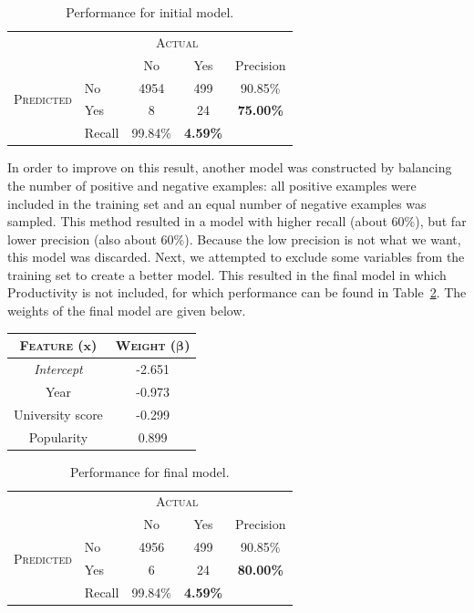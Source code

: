 \begin{table}
\centering
\begin{tabular}{c|l|c|c|c}
\multicolumn{2}{c|}{} & \multicolumn{2}{c|}{\textsc{Actual}}&\\ \cline{3-4}
\multicolumn{2}{c|}{\rule{0pt}{4mm}} &No&Yes&Precision\\ \hline
\multirow{2}{*}{\textsc{Predicted}}&\rule{0pt}{4mm}No&4954&499&90.85\%\\ \cline{2-5}
\rule{0pt}{4mm}&Yes&8&24&\textbf{75.00\%}\\ \hline
&\rule{0pt}{4mm}Recall&99.84\%&\textbf{4.59\%}&\\
\end{tabular}
\caption{Performance for initial model.}
\label{tbl:initialPerformance}
\end{table}

In order to improve on this result, another model was constructed by balancing the number of positive and negative examples: all positive examples were included in the training set and an equal number of negative examples was sampled. This method resulted in a model with higher recall (about 60\%), but far lower precision (also about 60\%). Because the low precision is not what we want, this model was discarded. Next, we attempted to exclude some variables from the training set to create a better model. This resulted in the final model in which Productivity is not included, for which performance can be found in Table~\ref{tbl:resultingPerformance}. The weights of the final model are given below.
\begin{table}[H]
\centering
\begin{tabular}{c|c}
\textsc{\textbf{Feature}} ($\mathbf{x}$) & \textsc{\textbf{Weight}} ($\boldsymbol{\beta}$)\\ \hline
\rule{0pt}{4mm}\emph{Intercept}&-2.651\\
Year&-0.973\\
University score&-0.299\\
Popularity&0.899\\
\end{tabular}
\end{table}


\begin{table}
\centering
\begin{tabular}{c|l|c|c|c}
\multicolumn{2}{c|}{} & \multicolumn{2}{c|}{\textsc{Actual}}&\\ \cline{3-4}
\multicolumn{2}{c|}{\rule{0pt}{4mm}} &No&Yes&Precision\\ \hline
\multirow{2}{*}{\textsc{Predicted}}&\rule{0pt}{4mm}No&4956&499&90.85\%\\ \cline{2-5}
\rule{0pt}{4mm}&Yes&6&24&\textbf{80.00\%}\\ \hline
&\rule{0pt}{4mm}Recall&99.84\%&\textbf{4.59\%}&\\
\end{tabular}
\caption{Performance for final model.}
\label{tbl:resultingPerformance}
\end{table}
